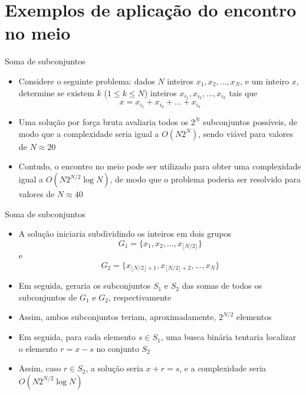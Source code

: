 \section{Exemplos de aplicação do encontro no meio}

\begin{frame}[fragile]{Soma de subconjuntos}

    \begin{itemize}
        \item Considere o seguinte problema: dados $N$ inteiros $x_1, x_2, \ldots, x_N$, e um
            inteiro $x$, determine se existem $k$ ($1\leq k\leq N$) inteiros 
            $x_{i_1}, x_{i_2}, \ldots, x_{i_k}$ tais que
            \[
                x = x_{i_1} + x_{i_2} + \ldots + x_{i_k}
            \] 

        \item Uma solução por força bruta avaliaria todos os $2^N$ subconjuntos possíveis, de modo
            que a complexidade seria igual a $O(N2^N)$, sendo viável para valores de $N \approx 20$

        \item Contudo, o encontro no meio pode ser utilizado para obter uma complexidade
            igual a $O(N2^{N/2}\log N)$, de modo que o problema poderia ser resolvido para valores de
            $N\approx 40$
       
    \end{itemize}

\end{frame}

\begin{frame}[fragile]{Soma de subconjuntos}

    \begin{itemize}
        \item A solução iniciaria subdividindo os inteiros em dois grupos
        \[
            G_1 = \lbrace x_1, x_2, \ldots, x_{\lfloor N/2\rfloor}\rbrace
        \]
        e
        \[
            G_2 = \lbrace x_{\lfloor N/2\rfloor + 1}, x_{\lfloor N/2\rfloor + 2}, \ldots, x_{N}\rbrace
        \]

        \item Em seguida, geraria os subconjuntos $S_1$ e $S_2$ das somas de todos os subconjuntos de
            $G_1$ e $G_2$, respectivamente

        \item Assim, ambos subconjuntos teriam, aproximadamente, $2^{N/2}$ elementos

        \item Em seguida, para cada elemento $s\in S_1$, uma busca binária tentaria localizar o
            elemento $r = x - s$ no conjunto $S_2$

        \item Assim, caso $r\in S_2$, a solução seria $x + r = s$, e a complexidade seria
            $O(N2^{N/2}\log N)$
    \end{itemize}

\end{frame}

